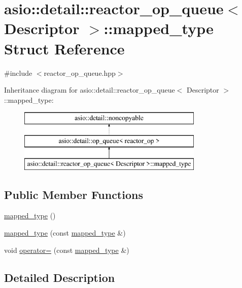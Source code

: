 \hypertarget{structasio_1_1detail_1_1reactor__op__queue_1_1mapped__type}{}\section{asio\+:\+:detail\+:\+:reactor\+\_\+op\+\_\+queue$<$ Descriptor $>$\+:\+:mapped\+\_\+type Struct Reference}
\label{structasio_1_1detail_1_1reactor__op__queue_1_1mapped__type}


{\ttfamily \#include $<$reactor\+\_\+op\+\_\+queue.\+hpp$>$}

Inheritance diagram for asio\+:\+:detail\+:\+:reactor\+\_\+op\+\_\+queue$<$ Descriptor $>$\+:\+:mapped\+\_\+type\+:\begin{figure}[H]
\begin{center}
\leavevmode
\includegraphics[height=3.000000cm]{structasio_1_1detail_1_1reactor__op__queue_1_1mapped__type}
\end{center}
\end{figure}
\subsection*{Public Member Functions}
\begin{DoxyCompactItemize}
\item 
\hyperlink{structasio_1_1detail_1_1reactor__op__queue_1_1mapped__type_a8eecf21b862553449b8036077a0de894}{mapped\+\_\+type} ()
\item 
\hyperlink{structasio_1_1detail_1_1reactor__op__queue_1_1mapped__type_a20efecd14323f9f1b8c82eef06e7a02f}{mapped\+\_\+type} (const \hyperlink{structasio_1_1detail_1_1reactor__op__queue_1_1mapped__type}{mapped\+\_\+type} \&)
\item 
void \hyperlink{structasio_1_1detail_1_1reactor__op__queue_1_1mapped__type_acab59db2ea8a1cae44407589740de342}{operator=} (const \hyperlink{structasio_1_1detail_1_1reactor__op__queue_1_1mapped__type}{mapped\+\_\+type} \&)
\end{DoxyCompactItemize}


\subsection{Detailed Description}

